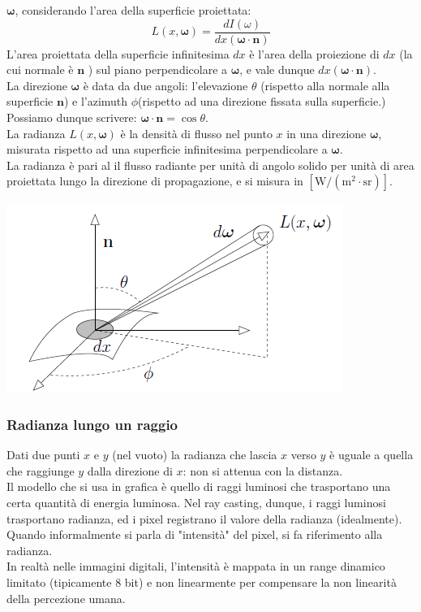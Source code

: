 \documentclass[a4paper, 10pt]{article}
\renewcommand{\vec}{\bm}
\begin{document}
\begin{itemize}
			$ \vec{\omega} $, considerando l’area della superficie proiettata:
			\[
				L(x,\vec{\omega}) = \dfrac{dI(\omega)}{dx(\vec{\omega}\cdot\vec{n})}
			\]
			L’area proiettata della superficie infinitesima $ dx $
			è l’area della proiezione di $ dx $ (la cui normale è $ \vec{n} $ ) sul
			piano perpendicolare a $ \vec{\omega} $, e vale dunque $ dx(\vec{\omega}\cdot\vec{n}) $.\\
			La direzione $ \vec{\omega} $ è data da due angoli: l’elevazione $ \theta $ (rispetto
			alla normale alla superficie $ \vec{n} $) e l’azimuth $ \phi $(rispetto ad una
			direzione fissata sulla superficie.)\\
			Possiamo dunque scrivere: $ \vec{\omega}\cdot\vec{n} = \cos\theta$.\\
			La radianza $ L(x,\vec{\omega}) $ è la densità di flusso nel punto $ x $ in una direzione $ \vec{\omega} $, misurata rispetto ad una superficie
			infinitesima perpendicolare a $ \vec{\omega} $.\\
			La radianza è pari al il flusso	radiante per unità di angolo
			solido per unità di area proiettata	lungo la direzione di propagazione, e si misura in 
			$ \left[ \si{\watt}/(\si{\meter}^2 \cdot \si{\steradian}) \right] $.
			
			\begin{center}
				\includegraphics[scale=0.4]{radianza}
			\end{center}
		\end{itemize}
		
		\subsubsection{Radianza lungo un raggio}
			Dati due punti $ x $ e $ y $ (nel vuoto) la radianza che lascia $ x $ verso
			$ y $ è uguale a quella che raggiunge $ y $ dalla direzione di $ x $: non si
			attenua con la distanza.\\
			Il modello che si usa in grafica è quello di raggi luminosi che
			trasportano una certa quantità di energia luminosa.
			Nel ray casting, dunque, i raggi luminosi trasportano radianza,
			ed i pixel registrano il valore della radianza (idealmente).\\
			Quando informalmente si parla di "intensità" del pixel, si fa
			riferimento alla radianza.\\
			In realtà nelle immagini digitali, l'intensità è mappata in un
			range dinamico limitato (tipicamente 8 bit) e non linearmente
			per compensare la non linearità della percezione umana.
			
\end{document}
